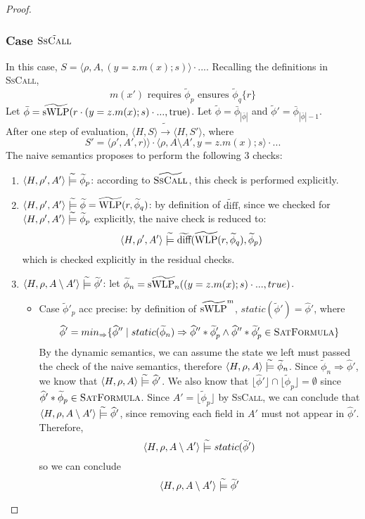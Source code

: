 \documentclass {article}
\newcommand{\true}{\text{true}}
\newcommand{\fphi}{\widehat{\phi}}
\newcommand{\tphi}{\widetilde{\phi}}
\newcommand{\imp}{\Rightarrow}
\newcommand{\tconsistent}{\hspace{1mm}\widetilde{\models}\hspace{1mm}}
\newcommand{\twlp}[2]{\widetilde{\textup{WLP}}(#1,#2)}
\newcommand{\tswlp}[2]{\widetilde{\textup{sWLP}}(#1,#2)}
\newcommand{\tswlpn}[2]{\widetilde{\textup{sWLP}_n}(#1,#2)}
\newcommand{\tdiff}[2]{\widetilde{\textup{diff}}(#1,#2)}
\newcommand{\satdef}{\textsc{SatFormula}}
\begin{document}
\begin{proof}
\subsubsection*{Case $\tilde{\textsc{SsCall}}$}
In this case, $S = \langle \rho, A, (y = z.m(x); s)\rangle \cdot ...$. Recalling the definitions in \textsc{SsCall}, $$m(x′) \text{ requires } \tphi_p \text{ ensures } \tphi_q \{ r \}$$ 
Let $\bar{\phi}  = \tswlp{r \cdot (y = z.m(x);s) \cdot ...}{\true}$. Let $\tphi = \bar{\phi} _{|\bar{\phi} |}$ and $\tphi' = \bar{\phi} _{|\bar{\phi} |-1}$.\\
After one step of evaluation, $\langle H,S \rangle \widetilde{\longrightarrow} \langle H,S' \rangle$, where $$S' =  \langle \rho', A', r) \rangle \cdot \langle \rho, A \setminus A', y = z.m(x); s\rangle \cdot ...$$
The naive semantics proposes to perform the following 3 checks:
\begin{enumerate}
	\item $\langle H, \rho', A'  \rangle \tconsistent \tphi_p$: according to $\widetilde{\textsc{SsCall}}$, this check is performed explicitly.\\ 
	\item $\langle H, \rho', A'  \rangle \tconsistent \tphi = \twlp{r}{\tphi_q}$: by definition of $\widetilde{\text{diff}}$, since we checked for $\langle H, \rho', A'  \rangle \tconsistent  \tphi_p$ explicitly, the naive check is reduced to:
$$\langle H, \rho', A'  \rangle \tconsistent \tdiff{\twlp{r}{\tphi_q}}{\tphi_p}$$which is checked explicitly in the residual checks.
	\item $\langle H, \rho, A \setminus A' \rangle \tconsistent \tphi'$: let $\tphi_n = \tswlpn{(y = z.m(x);s) \cdot ...}{true}$.\\
\begin{itemize}
	\item Case $\tphi'_p$ acc precise: by definition of $\widetilde{\textup{sWLP}}^m$, $static(\tphi') = \fphi'$, where $$\fphi' = min_{\imp}\{\fphi'' \mid static(\tphi_n) \imp \fphi'' \ast \tphi'_p \wedge \fphi'' \ast \tphi'_p \in \satdef\}$$ By the dynamic semantics, we can assume the state we left must passed the check of the naive semantics, therefore $\langle H, \rho, A \rangle \tconsistent \tphi_n$. Since $\tphi_n \imp \fphi'$, we know that $\langle H, \rho, A \rangle \tconsistent \fphi'$. We also know that $\lfloor \fphi' \rfloor \cap \lfloor \tphi_p \rfloor = \emptyset$ since $\fphi' \ast \tphi_p \in \satdef$. Since $A' = \lfloor \tphi_p \rfloor$ by \textsc{SsCall}, we can conclude that $\langle H, \rho, A \setminus A'\rangle \tconsistent \fphi'$, since removing each field in $A'$ must not appear in $\fphi'$. Therefore, $$\langle H, \rho, A \setminus A'\rangle \tconsistent static(\tphi')$$ so we can conclude $$\langle H, \rho, A \setminus A'\rangle \tconsistent \tphi'$$
	

\end{itemize}
\end{enumerate}
\end{proof}
\end{document}
